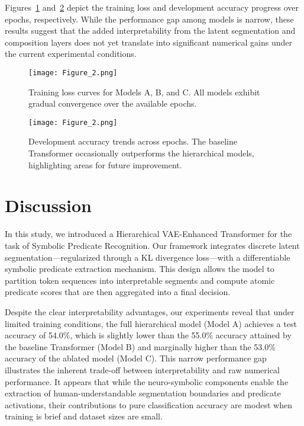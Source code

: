 \documentclass{article}
\begin{document}
Figures~\ref{fig:loss_curves} and~\ref{fig:dev_acc} depict the training loss and development accuracy progress over epochs, respectively. While the performance gap among models is narrow, these results suggest that the added interpretability from the latent segmentation and composition layers does not yet translate into significant numerical gains under the current experimental conditions.

\begin{figure}[h]
\centering
\texttt{[image: Figure\_2.png]}
\caption{Training loss curves for Models A, B, and C. All models exhibit gradual convergence over the available epochs.}
\label{fig:loss_curves}
\end{figure}

\begin{figure}[h]
\centering
\texttt{[image: Figure\_2.png]}
\caption{Development accuracy trends across epochs. The baseline Transformer occasionally outperforms the hierarchical models, highlighting areas for future improvement.}
\label{fig:dev_acc}
\end{figure}

\section{Discussion}
In this study, we introduced a Hierarchical VAE-Enhanced Transformer for the task of Symbolic Predicate Recognition. Our framework integrates discrete latent segmentation—regularized through a KL divergence loss—with a differentiable symbolic predicate extraction mechanism. This design allows the model to partition token sequences into interpretable segments and compute atomic predicate scores that are then aggregated into a final decision.

Despite the clear interpretability advantages, our experiments reveal that under limited training conditions, the full hierarchical model (Model A) achieves a test accuracy of 54.0\%, which is slightly lower than the 55.0\% accuracy attained by the baseline Transformer (Model B) and marginally higher than the 53.0\% accuracy of the ablated model (Model C). This narrow performance gap illustrates the inherent trade-off between interpretability and raw numerical performance. It appears that while the neuro-symbolic components enable the extraction of human-understandable segmentation boundaries and predicate activations, their contributions to pure classification accuracy are modest when training is brief and dataset sizes are small.
\end{document}
